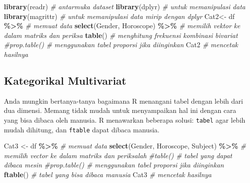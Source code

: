 \documentclass[
]{book}
\newenvironment{Shaded}{\begin{snugshade}}{\end{snugshade}}
\newcommand{\CommentTok}[1]{\textcolor[rgb]{0.56,0.35,0.01}{\textit{#1}}}
\newcommand{\FunctionTok}[1]{\textcolor[rgb]{0.13,0.29,0.53}{\textbf{#1}}}
\newcommand{\NormalTok}[1]{#1}
\newcommand{\OtherTok}[1]{\textcolor[rgb]{0.56,0.35,0.01}{#1}}
\newcommand{\SpecialCharTok}[1]{\textcolor[rgb]{0.81,0.36,0.00}{\textbf{#1}}}
\begin{document}
\begin{Shaded}
\begin{Highlighting}[]
\FunctionTok{library}\NormalTok{(readr)                                     }\CommentTok{\# antarmuka dataset}
\FunctionTok{library}\NormalTok{(dplyr)                                     }\CommentTok{\# untuk memanipulasi data}
\FunctionTok{library}\NormalTok{(magrittr)                                  }\CommentTok{\# untuk memanipulasi data mirip dengan dplyr}
\NormalTok{Cat2}\OtherTok{\textless{}{-}}\NormalTok{ df }\SpecialCharTok{\%\textgreater{}\%}                                      \CommentTok{\# memuat data}
\FunctionTok{select}\NormalTok{(Gender, Horoscope) }\SpecialCharTok{\%\textgreater{}\%}                      \CommentTok{\# memilih vektor ke dalam matriks dan periksa}
\FunctionTok{table}\NormalTok{()                                            }\CommentTok{\# menghitung frekuensi kombinasi bivariat }
\CommentTok{\#prop.table()                                      \# menggunakan tabel proporsi jika diinginkan}
\NormalTok{Cat2                                               }\CommentTok{\# mencetak hasilnya}
\end{Highlighting}
\end{Shaded}

\hypertarget{kategorikal-multivariat}{%
\subsection{Kategorikal Multivariat}\label{kategorikal-multivariat}}

Anda mungkin bertanya-tanya bagaimana R menangani tabel dengan lebih dari dua dimensi. Memang tidak mudah untuk menyampaikan hal ini dengan cara yang bisa dibaca oleh manusia. R menawarkan beberapa solusi: \texttt{tabel} agar lebih mudah dihitung, dan \texttt{ftable} dapat dibaca manusia.

\begin{Shaded}
\begin{Highlighting}[]
\NormalTok{Cat3 }\OtherTok{\textless{}{-}}\NormalTok{ df }\SpecialCharTok{\%\textgreater{}\%}                                     \CommentTok{\# memuat data}
\FunctionTok{select}\NormalTok{(Gender, Horoscope, Subject) }\SpecialCharTok{\%\textgreater{}\%}             \CommentTok{\# memilih vector ke dalam matriks dan periksalah}
\CommentTok{\#table()                                           \# tabel yang dapat dibaca mesin}
\CommentTok{\#prop.table()                                      \# menggunakan tabel proporsi jika diinginkan}
\FunctionTok{ftable}\NormalTok{()                                           }\CommentTok{\# tabel yang bisa dibaca manusia}
\NormalTok{Cat3                                               }\CommentTok{\# mencetak hasilnya}
\end{Highlighting}
\end{Shaded}
\end{document}
